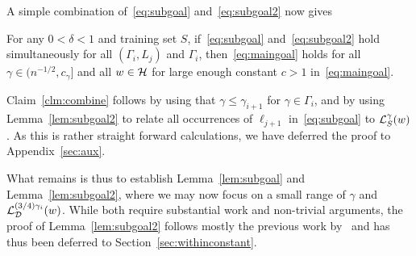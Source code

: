 A simple combination of~\eqref{eq:subgoal} and~\eqref{eq:subgoal2} now gives
\begin{claim}
\label{clm:combine}
For any $0 < \delta < 1$ and training set $S$, if~\eqref{eq:subgoal} and~\eqref{eq:subgoal2} hold simultaneously for all $(\Gamma_i, L_j)$ and $\Gamma_i$, then~\eqref{eq:maingoal} holds for all $\gamma \in (n^{-1/2}, c_\gamma]$ and all $w \in \mathcal{H}$ for large enough constant $c>1$ in~\eqref{eq:maingoal}.
\end{claim}
Claim~\ref{clm:combine} follows by using that $\gamma \leq \gamma_{i+1}$ for $\gamma \in \Gamma_i$, and by using Lemma~\ref{lem:subgoal2} to relate all occurrences of $\ell_{j+1}$ in~\eqref{eq:subgoal} to $\mathcal{L}^\gamma_S(w)$. As this is rather straight forward calculations, we have deferred the proof to Appendix~\ref{sec:aux}.

What remains is thus to establish Lemma~\ref{lem:subgoal} and Lemma~\ref{lem:subgoal2}, where we may now focus on a small range of $\gamma$ and $\mathcal{L}^{(3/4)\gamma_i}_{\mathcal{D}}(w)$. While both require substantial work and non-trivial arguments, the proof of Lemma~\ref{lem:subgoal2} follows mostly the previous work by~\cite{SVMbest} and has thus been deferred to Section~\ref{sec:withinconstant}.



